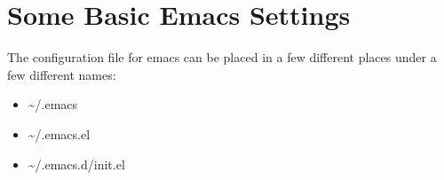 \section{Some Basic Emacs Settings}

The configuration file for emacs can be placed in a few different places under a few different names:
\begin{itemize}
    \item \textasciitilde/.emacs
    \item \textasciitilde/.emacs.el
    \item \textasciitilde/.emacs.d/init.el
\end{itemize}

